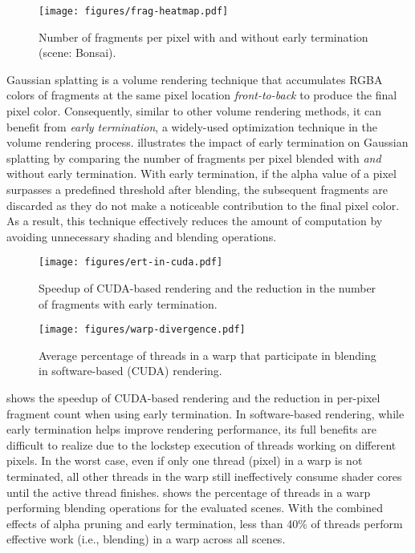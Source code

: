 \begin{figure}[t]
  \centering
  \texttt{[image: figures/frag-heatmap.pdf]}
  \caption{Number of fragments per pixel with and without early termination (scene: Bonsai).}
  \vspace{-0.20in}
  \label{fig:frag-heatmap}
\end{figure}

% 
Gaussian splatting is a volume rendering technique that accumulates RGBA colors
of fragments at the same pixel location \emph{front-to-back} to produce the
final pixel color.
%
Consequently, similar to other volume rendering methods, it can benefit from
\emph{early termination}, a widely-used optimization technique in the volume
rendering process.
%
 illustrates the impact of early termination on Gaussian
splatting by comparing the number of fragments per pixel blended with
\emph{and} without early termination.
%
With early termination, if the alpha value of a pixel surpasses a predefined
threshold after blending, the subsequent fragments are discarded as they do not
make a noticeable contribution to the final pixel color.
%
As a result, this technique effectively reduces the amount of computation by
avoiding unnecessary shading and blending operations.

\begin{figure}[t]
  \centering
  \texttt{[image: figures/ert-in-cuda.pdf]}
  \caption{Speedup of CUDA-based rendering and the reduction in the number of fragments with early termination.}
  \vspace{-0.10in}
  \label{fig:ert-in-cuda}
\end{figure}

\begin{figure}[t]
  \centering
  \texttt{[image: figures/warp-divergence.pdf]}
  \caption{Average percentage of threads in a warp that participate in blending in software-based (CUDA) rendering.}
  \vspace{-0.15in}
  \label{fig:warp-divergence}
\end{figure}


 shows the speedup of CUDA-based rendering and the
reduction in per-pixel fragment count when using early termination.
%
In software-based rendering, while early termination helps improve rendering
performance, its full benefits are difficult to realize due to the lockstep
execution of threads working on different pixels.
%
In the worst case, even if only one thread (pixel) in a warp is not terminated,
all other threads in the warp still ineffectively consume shader cores
until the active thread finishes.
%
 shows the percentage of threads in a warp performing
blending operations for the evaluated scenes.
%
With the combined effects of alpha pruning and early termination, less than
40\% of threads perform effective work (i.e., blending) in a warp across all
scenes.

